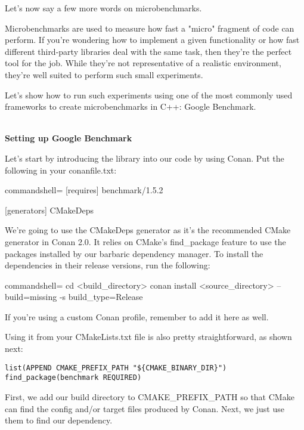 Let's now say a few more words on microbenchmarks.


Microbenchmarks are used to measure how fast a "micro" fragment of code can perform. If you're wondering how to implement a given functionality or how fast different third-party libraries deal with the same task, then they're the perfect tool for the job. While they're not representative of a realistic environment, they're well suited to perform such small experiments.

Let's show how to run such experiments using one of the most commonly used frameworks to create microbenchmarks in C++: Google Benchmark.

\hspace*{\fill} \\ %
\noindent
\textbf{Setting up Google Benchmark}

Let's start by introducing the library into our code by using Conan. Put the following in your conanfile.txt:

\begin{tcblisting}{commandshell={}}
[requires]
benchmark/1.5.2

[generators]
CMakeDeps	
\end{tcblisting}

We're going to use the CMakeDeps generator as it's the recommended CMake generator in Conan 2.0. It relies on CMake's find\_package feature to use the packages installed by our barbaric dependency manager. To install the dependencies in their release versions, run the following:

\begin{tcblisting}{commandshell={}}
cd <build_directory>
conan install <source_directory> --build=missing -s build_type=Release
\end{tcblisting}

If you're using a custom Conan profile, remember to add it here as well.

Using it from your CMakeLists.txt file is also pretty straightforward, as shown next:

\begin{lstlisting}[style=styleCMake]
list(APPEND CMAKE_PREFIX_PATH "${CMAKE_BINARY_DIR}")
find_package(benchmark REQUIRED)
\end{lstlisting}

First, we add our build directory to CMAKE\_PREFIX\_PATH so that CMake can find the config and/or target files produced by Conan. Next, we just use them to find our dependency.

